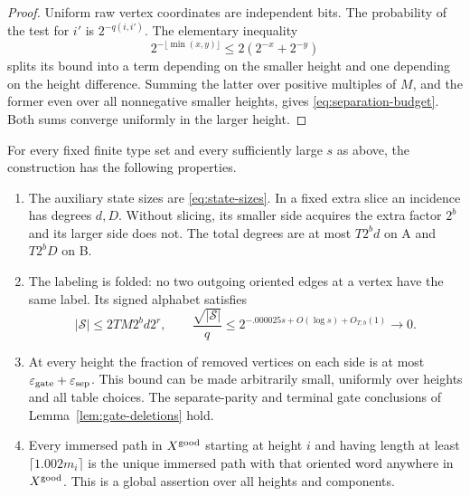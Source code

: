 \begin{proof}
Uniform raw vertex coordinates are independent bits.  The probability
of the test for $i'$ is $2^{-q(i,i')}$.  The elementary inequality
\[
 2^{-\lfloor\min(x,y)\rfloor}\le2(2^{-x}+2^{-y})
\]
splits its bound into a term depending on the smaller height and one
depending on the height difference.  Summing the latter over positive
multiples of $M$, and the former even over all nonnegative smaller
heights, gives \eqref{eq:separation-budget}.  Both sums converge
uniformly in the larger height.
\end{proof}

\begin{proposition}\label{prop:tower-labels}
For every fixed finite type set and every sufficiently large $s$ as
above, the construction has the following properties.
\begin{enumerate}
\item The auxiliary state sizes are \eqref{eq:state-sizes}.  In a fixed
extra slice an incidence has degrees $d,D$.  Without slicing, its
smaller side acquires the extra factor $2^b$ and its larger side does
not.  The total degrees are at most $T2^b d$ on A and $T2^bD$ on B.
\item The labeling is folded: no two outgoing oriented edges at a
vertex have the same label.  Its signed alphabet satisfies
\begin{equation}\label{eq:sharp-alphabet}
 |\mathcal S|\le 2TM2^b d2^r,
 \qquad
 \frac{\sqrt{|\mathcal S|}}q
 \le 2^{-.000025s+O(\log s)+O_{T,b}(1)}\longrightarrow0.
\end{equation}
\item At every height the fraction of removed vertices on each side is
at most $\varepsilon_{\rm gate}+\varepsilon_{\rm sep}$.  This bound can
be made arbitrarily small, uniformly over heights and all table choices.
The separate-parity and terminal gate conclusions of
Lemma~\ref{lem:gate-deletions} hold.
\item Every immersed path in $X^{\rm good}$ starting at height $i$ and
having length at least $\lceil1.002m_i\rceil$ is the unique immersed
path with that oriented word anywhere in $X^{\rm good}$.  This is a
global assertion over all heights and components.
\end{enumerate}
\end{proposition}

